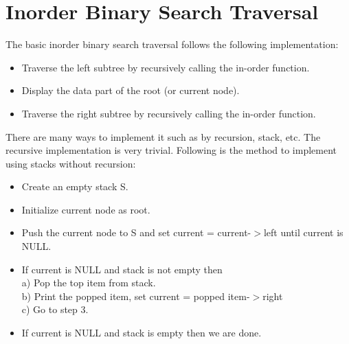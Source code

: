 \section{Inorder Binary Search Traversal}
The basic inorder binary search traversal follows the following implementation:
\begin{itemize}
	\item Traverse the left subtree by recursively calling the in-order function.
	\item Display the data part of the root (or current node).
	\item Traverse the right subtree by recursively calling the in-order function.
\end{itemize}
There are many ways to implement it such as by recursion, stack, etc.
The recursive implementation is very trivial. Following is the method to implement using stacks without recursion:
\begin{itemize}
	\item Create an empty stack S.
	\item Initialize current node as root.
	\item Push the current node to S and set current = current-$>$left until current is NULL.
	\item If current is NULL and stack is not empty then \\
     a) Pop the top item from stack.\\
     b) Print the popped item, set current = popped item-$>$right \\
     c) Go to step 3.
    \item If current is NULL and stack is empty then we are done.	
\end{itemize}
\cite{knuth1973vol}